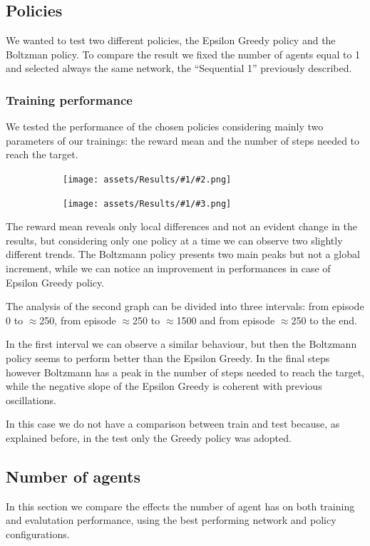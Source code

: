 \documentclass[13pt]{article}
\newcommand{\figrowtwo}[3]{ %
    \begin{figure}[H]
        \centering
        \begin{subfigure}[b]{0.49\textwidth}
            \centering
            \texttt{[image: assets/Results/\#1/\#2.png]}
        \end{subfigure}
        \hfill
        \begin{subfigure}[b]{0.49\textwidth}
            \centering
            \texttt{[image: assets/Results/\#1/\#3.png]}
        \end{subfigure}
    \end{figure}
}
\begin{document}

\subsection{Policies}
We wanted to test two different policies, the Epsilon Greedy policy and the Boltzman policy. To compare the result we fixed the number of agents equal to 1 and selected always the same network, the “Sequential 1” previously described.

\subsubsection*{Training performance}

We tested the performance of the chosen policies considering mainly two parameters of our trainings: the reward mean and the number of steps needed to reach the target.

\figrowtwo{Policy/Train}{reward_mean}{target_reached_in_steps}

The reward mean reveals only local differences and not an evident change in the results, but considering only one policy at a time we can observe two slightly different trends. The Boltzmann policy presents two main peaks but not a global increment, while we can notice an improvement in performances in case of Epsilon Greedy policy. 

The analysis of the second graph can be divided into three intervals: from episode 0 to $\approx$250, from episode $\approx$250 to $\approx$1500 and from episode $\approx$250 to the end.

In the first interval we can observe a similar behaviour, but then the Boltzmann policy seems to perform better than the Epsilon Greedy. In the final steps however Boltzmann has a peak in the number of steps needed to reach the target, while the negative slope of the Epsilon Greedy is coherent with previous oscillations.

In this case we do not have a comparison between train and test because, as explained before, in the test only the Greedy policy was adopted.


\subsection{Number of agents}
In this section we compare the effects the number of agent has on both training and evalutation performance, using the best performing network and policy configurations.
\end{document}

